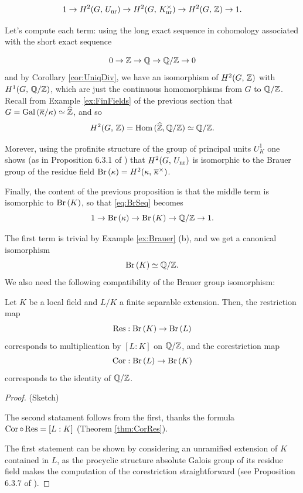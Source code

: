 \documentclass[a4paper, oneside]{memoir}
\begin{document}
\begin{equation}\label{eq:BrSeq}
	1\to H^{2}( G, \, U_{\text{nr}} )\to H^{2}( G, \, K_{\text{nr}}^\times )\to H^{2}( G, \, \mathbb{Z} )\to 1.
\end{equation}

Let's compute each term: using the long exact sequence in cohomology associated with the short exact sequence

\[
	0\to\mathbb{Z}\to\mathbb{Q}\to\mathbb{Q}/\mathbb{Z}\to 0
\]
and by Corollary \ref{cor:UniqDiv}, we have an isomorphism of $H^{2}( G, \, \mathbb{Z} )$ with $H^{1}( G, \, \mathbb{Q}/\mathbb{Z} )$, which are just the continuous homomorphisms from $G$ to $\mathbb{Q}/\mathbb{Z}$. Recall from Example
\ref{ex:FinFields} of the previous
section that $G=\operatorname{Gal}{(\overline{\kappa}/\kappa)}\simeq\widehat{\mathbb{Z}}$, and so
\[
	H^{2}( G, \, \mathbb{Z} )=\operatorname{Hom}{(\widehat{\mathbb{Z}},\mathbb{Q}/\mathbb{Z})}\simeq\mathbb{Q}/\mathbb{Z}.
\]

Morever, using the profinite structure of the group of principal units $U_K^1$ one shows (as in Proposition 6.3.1 of \cite{GilleSzamuely}) that $H^{2}( G, \, U_{\text{nr}} )$ is isomorphic to
the Brauer group of the residue field $\operatorname{Br}{(\kappa)}=H^{2}( \kappa, \, \overline{\kappa}^\times )$.

Finally, the content of the previous proposition is that the middle term is isomorphic to $\operatorname{Br}{(K)}$, so that \eqref{eq:BrSeq} becomes
\[
	1\to\operatorname{Br}{(\kappa)}\to\operatorname{Br}{(K)}\to\mathbb{Q}/\mathbb{Z}\to 1.
\]

The first term is trivial by Example \ref{ex:Brauer} (b), and we get a canonical isomorphism
\begin{equation}\label{eq:BrK}
	\operatorname{Br}{(K)}\simeq\mathbb{Q}/\mathbb{Z}.
\end{equation}
We also need the following compatibility of the Brauer group isomorphism:

\begin{proposition}\label{prop:BrCorRes}
	Let $K$ be a local field and $L/K$ a finite separable extension. Then, the restriction map
	\[
		\operatorname{Res}: \operatorname{Br}{(K)}\to\operatorname{Br}{(L)}
	\]
	corresponds to multiplication by $[L:K]$ on $\mathbb{Q}/\mathbb{Z}$,
	and the corestriction map
	\[
		\operatorname{Cor}: \operatorname{Br}{(L)}\to\operatorname{Br}{(K)}
	\]
	corresponds to the identity of $\mathbb{Q}/\mathbb{Z}$.
\end{proposition}

\begin{proof}{(Sketch)}

	The second statament follows from the first, thanks the formula $\operatorname{Cor} \circ \operatorname{Res} = [L:K]$ (Theorem \ref{thm:CorRes}).

	The first statement can be shown by considering an unramified extension of $K$ contained in $L$, as the procyclic structure absolute Galois group of its residue field makes the computation of the corestriction
	straightforward (see Proposition 6.3.7 of \cite{GilleSzamuely}).
\end{proof}
\end{document}

